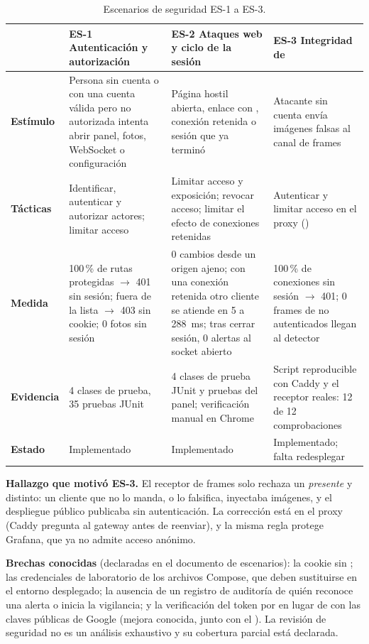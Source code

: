 \begin{table}[H]
\centering\small
\caption{Escenarios de seguridad ES-1 a ES-3.}\label{tab:es}
\begin{tabularx}{\textwidth}{lYYY}
\toprule
 & \textbf{ES-1 Autenticación y autorización} & \textbf{ES-2 Ataques web y ciclo de la sesión} & \textbf{ES-3 Integridad de } \\
\midrule
\textbf{Estímulo} & Persona sin cuenta o con una cuenta válida pero no autorizada intenta abrir panel, fotos, WebSocket o configuración &
Página hostil abierta, enlace con , conexión retenida o sesión que ya terminó &
Atacante sin cuenta envía imágenes falsas al canal de frames \\
\textbf{Tácticas} & Identificar, autenticar y autorizar actores; limitar acceso & Limitar acceso y exposición; revocar acceso; limitar el efecto de conexiones retenidas & Autenticar y limitar acceso en el proxy () \\
\textbf{Medida} & 100\,\% de rutas protegidas $\rightarrow$ 401 sin sesión; fuera de la lista $\rightarrow$ 403 sin cookie; 0 fotos sin sesión &
0 cambios desde un origen ajeno; con una conexión retenida otro cliente se atiende en 5 a 288~ms; tras cerrar sesión, 0 alertas al socket abierto &
100\,\% de conexiones sin sesión $\rightarrow$ 401; 0 frames de no autenticados llegan al detector \\
\textbf{Evidencia} & 4 clases de prueba, 35 pruebas JUnit & 4 clases de prueba JUnit y pruebas del panel; verificación manual en Chrome & Script reproducible con Caddy y el receptor reales: 12 de 12 comprobaciones \\
\textbf{Estado} & Implementado & Implementado & Implementado; falta redesplegar \\
\bottomrule
\end{tabularx}
\end{table}

\textbf{Hallazgo que motivó ES-3.} El receptor de frames solo rechaza un  \emph{presente} y distinto: un cliente que no lo manda, o
lo falsifica, inyectaba imágenes, y el despliegue público publicaba  sin autenticación. La corrección está en el proxy (Caddy
pregunta al gateway antes de reenviar), y la misma regla protege Grafana, que ya no admite acceso anónimo.

\textbf{Brechas conocidas} (declaradas en el documento de escenarios): la cookie sin ; las credenciales de laboratorio de los
archivos Compose, que deben sustituirse en el entorno desplegado; la ausencia de un registro de auditoría de quién reconoce una alerta o inicia
la vigilancia; y la verificación del token por  en lugar de con las claves públicas de Google (mejora conocida, junto con el
). La revisión de seguridad no es un análisis exhaustivo y su cobertura parcial está declarada.
